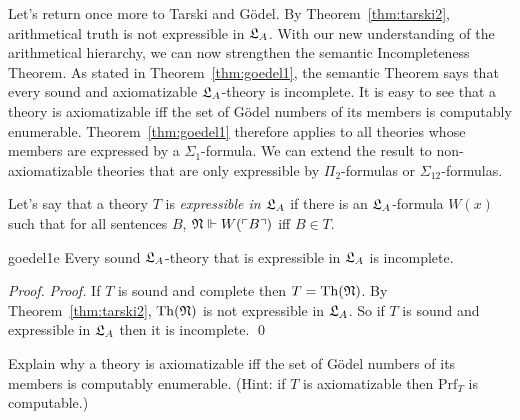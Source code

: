 Let's return once more to Tarski and Gödel.
By Theorem~\ref{thm:tarski2},
arithmetical truth is not expressible in $\mathfrak{L}_A$.
With our new understanding of the arithmetical hierarchy,
we can now strengthen the semantic Incompleteness Theorem.
As stated in Theorem~\ref{thm:goedel1},
the semantic Theorem says that
every sound and axiomatizable $\mathfrak{L}_A$-theory is incomplete.
It is easy to see that a theory is axiomatizable
iff the set of Gödel numbers of its members is computably enumerable.
Theorem~\ref{thm:goedel1} therefore applies to all theories
whose members are expressed by a $\Sigma_{1}$-formula.
We can extend the result to non-axiomatizable theories that
are only expressible by $\Pi_{2}$-formulas or $\Sigma_{12}$-formulas.

Let's say that a theory $T$ is \emph{expressible in $\mathfrak{L}_A$} if
there is an $\mathfrak{L}_A$-formula $W(x)$ such that
for all sentences $B$, ${\mathfrak{N} \Vdash W(\ulcorner B \urcorner)}$ iff $B \in T$.

\begin{theorem}{}{goedel1e}
  Every sound $\mathfrak{L}_A$-theory that is expressible in $\mathfrak{L}_A$ is incomplete.
\end{theorem}
\begin{proof}
  \emph{Proof.}
  If $T$ is sound and complete then $T = \mathrm{Th}(\mathfrak{N})$.
  By Theorem~\ref{thm:tarski2},
  $\mathrm{Th}(\mathfrak{N})$ is not expressible in $\mathfrak{L}_A$.
  So if $T$ is sound and expressible in $\mathfrak{L}_A$
  then it is incomplete.
  \qed
\end{proof} 

\begin{exercise}
  Explain why a theory is axiomatizable iff
  the set of Gödel numbers of its members is computably enumerable.
  (Hint: if $T$ is axiomatizable then $\mathrm{Prf}_T$ is computable.)
\end{exercise}










